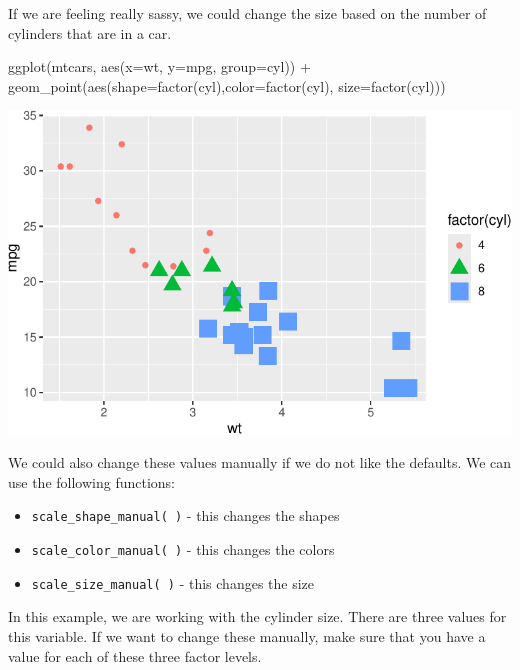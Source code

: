 \documentclass[
  letterpaper,
  DIV=11,
  numbers=noendperiod]{scrreprt}
\newenvironment{Shaded}{\begin{snugshade}}{\end{snugshade}}
\newcommand{\AttributeTok}[1]{\textcolor[rgb]{0.40,0.45,0.13}{#1}}
\newcommand{\FunctionTok}[1]{\textcolor[rgb]{0.28,0.35,0.67}{#1}}
\newcommand{\NormalTok}[1]{\textcolor[rgb]{0.00,0.23,0.31}{#1}}
\newcommand{\SpecialCharTok}[1]{\textcolor[rgb]{0.37,0.37,0.37}{#1}}
\providecommand{\tightlist}{%
  \setlength{\itemsep}{0pt}\setlength{\parskip}{0pt}}\usepackage{longtable,booktabs,array}
\begin{document}
If we are feeling really sassy, we could change the size based on the
number of cylinders that are in a car.

\begin{Shaded}
\begin{Highlighting}[]
\FunctionTok{ggplot}\NormalTok{(mtcars, }\FunctionTok{aes}\NormalTok{(}\AttributeTok{x=}\NormalTok{wt, }\AttributeTok{y=}\NormalTok{mpg, }\AttributeTok{group=}\NormalTok{cyl)) }\SpecialCharTok{+}
  \FunctionTok{geom\_point}\NormalTok{(}\FunctionTok{aes}\NormalTok{(}\AttributeTok{shape=}\FunctionTok{factor}\NormalTok{(cyl),}\AttributeTok{color=}\FunctionTok{factor}\NormalTok{(cyl), }\AttributeTok{size=}\FunctionTok{factor}\NormalTok{(cyl)))}
\end{Highlighting}
\end{Shaded}

\includegraphics{Advanced_Scatterplot_Techniques_files/figure-pdf/unnamed-chunk-11-1.pdf}

We could also change these values manually if we do not like the
defaults. We can use the following functions:

\begin{itemize}
\tightlist
\item
  \texttt{scale\_shape\_manual(\ )} - this changes the shapes
\item
  \texttt{scale\_color\_manual(\ )} - this changes the colors
\item
  \texttt{scale\_size\_manual(\ )} - this changes the size
\end{itemize}

In this example, we are working with the cylinder size. There are three
values for this variable. If we want to change these manually, make sure
that you have a value for each of these three factor levels.
\end{document}
